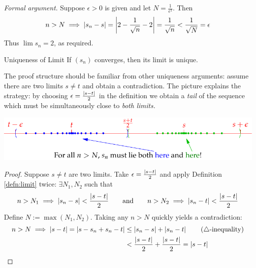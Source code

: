 \begin{example}{}{}
	\emph{Formal argument.}\quad
	Suppose $\epsilon>0$ is given and let $N=\frac 1{\epsilon^2}$. Then
	\[
		n>N\implies \left| s_n-s\right|=\left| 2-\frac 1{\sqrt n}-2\right| =\frac 1{\sqrt n}<\frac 1{\sqrt N}=\epsilon
	\]
	Thus $\lim s_n=2$, as required.
\end{example}


\goodbreak



% 


\begin{lemm}{Uniqueness of Limit}{}
	If $(s_n)$ converges, then its limit is unique.
\end{lemm}

The proof structure should be familiar from other uniqueness arguments: assume there are two limits $s\neq t$ and obtain a contradiction. The picture explains the strategy: by choosing $\epsilon=\frac{\left| s-t\right|}2$ in the definition we obtain a \emph{tail} of the sequence which must be simultaneously close to \emph{both limits.}
\begin{center}
	\includegraphics[scale=0.95]{limitunique}
\end{center}

\begin{proof}
	Suppose $s\neq t$ are two limits. Take $\epsilon=\frac{\left| s-t\right|}2$ and apply Definition \ref{defn:limit} twice: $\exists N_1,N_2$ such that
	\[
		n>N_1\implies \left| s_n-s\right|<\frac{\left| s-t\right|}2
		\qquad \text{and}\qquad 
		n>N_2\implies \left| s_n-t\right|<\frac{\left| s-t\right|}2
	\]
	Define $N:=\max(N_1,N_2)$. Taking any $n>N$ quickly yields a contradiction:
	\begin{align*}
		n>N\implies\left| s-t\right|=\left| s-s_n+s_n-t\right|
		&\le\left| s_n-s\right|+\left| s_n-t\right| \tag{$\triangle$-inequality}\\
		&<\frac{\left| s-t\right|}2+\frac{\left| s-t\right|}2 =\left| s-t\right| \tag*{\qedhere}
	\end{align*}
\end{proof}


